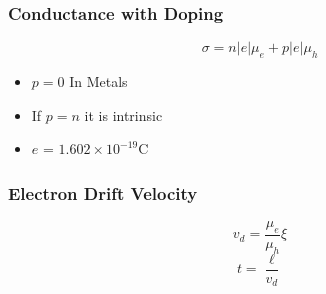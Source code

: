 		\subsubsection{Conductance with Doping} \label{subsubsec:Conductance with Doping}
			\begin{equation} \label{eq:Conductance with Doping}
				\sigma = n \lvert e \rvert \mu_{e} + p \lvert e \rvert \mu_{h}
			\end{equation}
			\begin{itemize}[noitemsep]
				\item $p=0$ In Metals
				\item If $p=n$ it is intrinsic
				\item $e$ = $1.602 \times 10^{-19} \si{\coulomb}$
			\end{itemize}
		
		\subsubsection{Electron Drift Velocity} \label{subsubsec:Electron Drift Velocity}
			\begin{equation} \label{eq:Electron Drift Velocity}
				v_{d} = \frac{\mu_{e}}{\mu_{h}} \xi
			\end{equation}
			\begin{equation} \label{eq:Time for Electron to Travel}
				t = \frac{\ell}{v_{d}}
			\end{equation}